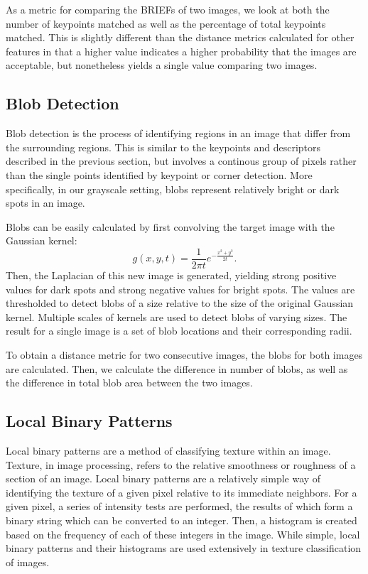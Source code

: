 As a metric for comparing the BRIEFs of two images, we look at both the number of keypoints matched as well as the percentage of total keypoints matched. 
This is slightly different than the distance metrics calculated for other features in that a higher value indicates a higher probability that the images are acceptable, but nonetheless yields a single value comparing two images.


\subsection{Blob Detection}

Blob detection is the process of identifying regions in an image that differ from the surrounding regions.
This is similar to the keypoints and descriptors described in the previous section, but involves a continous group of pixels rather than the single points identified by keypoint or corner detection.
More specifically, in our grayscale setting, blobs represent relatively bright or dark spots in an image.

Blobs can be easily calculated by first convolving the target image with the Gaussian kernel:
\begin{equation*}
g(x, y, t) = \frac{1}{2\pi t}e^{-\frac{x^2 + y^2}{2t}} .
\end{equation*}
Then, the Laplacian of this new image is generated, yielding strong positive values for dark spots and strong negative values for bright spots.
The values are thresholded to detect blobs of a size relative to the size of the original Gaussian kernel.
Multiple scales of kernels are used to detect blobs of varying sizes.
The result for a single image is a set of blob locations and their corresponding radii.

To obtain a distance metric for two consecutive images, the blobs for both images are calculated.
Then, we calculate the difference in number of blobs, as well as the difference in total blob area between the two images.


\subsection{Local Binary Patterns}

Local binary patterns are a method of classifying texture within an image.
Texture, in image processing, refers to the relative smoothness or roughness of a section of an image.
Local binary patterns are a relatively simple way of identifying the texture of a given pixel relative to its immediate neighbors.
For a given pixel, a series of intensity tests are performed, the results of which form a binary string which can be converted to an integer.
Then, a histogram is created based on the frequency of each of these integers in the image.
While simple, local binary patterns and their histograms are used extensively in texture classification of images.

